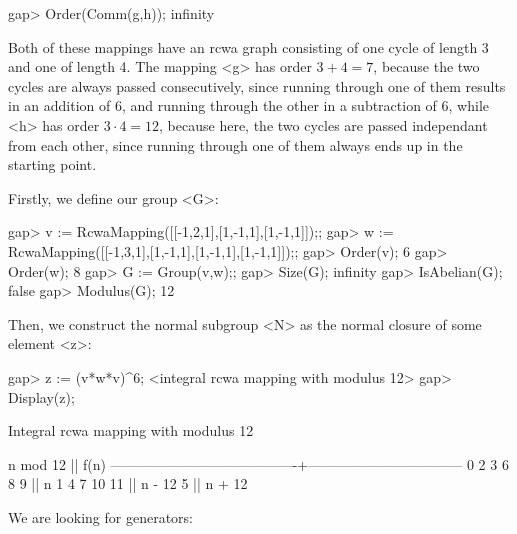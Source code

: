 gap> Order(Comm(g,h));
infinity
\endexample

Both of these mappings have an rcwa graph consisting of one cycle of
length 3 and one of length 4.
The mapping <g> has order $3 + 4 = 7$, because the two cycles are always
passed consecutively, since running through one of them results in an
addition of 6, and running through the other in a subtraction of 6,
while <h> has order $3 \cdot 4 = 12$, because here, the two cycles are
passed independant from each other, since running through one of them
always ends up in the starting point.


Firstly, we define our group <G>:

\beginexample
gap> v := RcwaMapping([[-1,2,1],[1,-1,1],[1,-1,1]]);;
gap> w := RcwaMapping([[-1,3,1],[1,-1,1],[1,-1,1],[1,-1,1]]);;
gap> Order(v);
6
gap> Order(w);
8
gap> G := Group(v,w);;
gap> Size(G);
infinity
gap> IsAbelian(G);
false
gap> Modulus(G);
12
\endexample

Then, we construct the normal subgroup <N> as the normal closure of
some element <z>:

\beginexample
gap> z := (v*w*v)^6;
<integral rcwa mapping with modulus 12>
gap> Display(z);

Integral rcwa mapping with modulus 12

               n mod 12                 ||              f(n)              
----------------------------------------+---------------------------------
   0  2  3  6  8  9                     || n
   1  4  7 10 11                        || n - 12
   5                                    || n + 12

\endexample

We are looking for generators:

